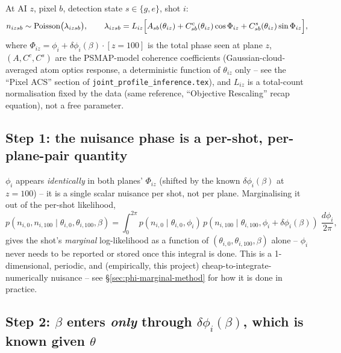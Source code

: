 \documentclass[11pt,a4paper]{article}
\newcommand{\code}[1]{\texttt{#1}}
\begin{document}
At AI $z$, pixel $b$, detection state $s\in\{g,e\}$, shot $i$:
\begin{equation}
  n_{izsb} \sim \mathrm{Poisson}\bigl(\lambda_{izsb}\bigr), \qquad
  \lambda_{izsb} = L_{iz}\Bigl[A_{sb}(\theta_{iz}) + C^c_{sb}(\theta_{iz})\cos\Phi_{iz}
                                                    + C^s_{sb}(\theta_{iz})\sin\Phi_{iz}\Bigr],
  \label{eq:obs-model}
\end{equation}
where $\Phi_{iz} = \phi_i + \delta\phi_i(\beta)\cdot[z{=}100]$ is the total
phase seen at plane $z$, $(A,C^c,C^s)$ are the PSMAP-model coherence
coefficients (Gaussian-cloud-averaged atom optics response, a deterministic
function of $\theta_{iz}$ only -- see the ``Pixel ACS'' section of
\code{joint\_profile\_inference.tex}), and $L_{iz}$ is a total-count
normalisation fixed by the data (same reference, ``Objective Rescaling''
recap equation), not a free parameter.

\subsection{Step 1: the nuisance phase is a per-shot, per-plane-pair
quantity}
\label{sec:step1}

$\phi_i$ appears \emph{identically} in both planes' $\Phi_{iz}$ (shifted by
the known $\delta\phi_i(\beta)$ at $z{=}100$) -- it is a single scalar
nuisance per shot, not per plane. Marginalising it out of the per-shot
likelihood,
\begin{equation}
  p(n_{i,0},n_{i,100}\mid\theta_{i,0},\theta_{i,100},\beta)
  = \int_0^{2\pi} p(n_{i,0}\mid\theta_{i,0},\phi_i)\,
              p(n_{i,100}\mid\theta_{i,100},\phi_i+\delta\phi_i(\beta))\;
              \frac{d\phi_i}{2\pi},
  \label{eq:marginal-phi}
\end{equation}
gives the shot's \emph{marginal} log-likelihood as a function of
$(\theta_{i,0},\theta_{i,100},\beta)$ alone -- $\phi_i$ never needs to be
reported or stored once this integral is done. This is a 1-dimensional,
periodic, and (empirically, this project) cheap-to-integrate-numerically
nuisance -- see \S\ref{sec:phi-marginal-method} for how it is done in
practice.

\subsection{Step 2: $\beta$ enters \emph{only} through $\delta\phi_i(\beta)$,
which is known given $\theta$}
\label{sec:step2}
\end{document}
